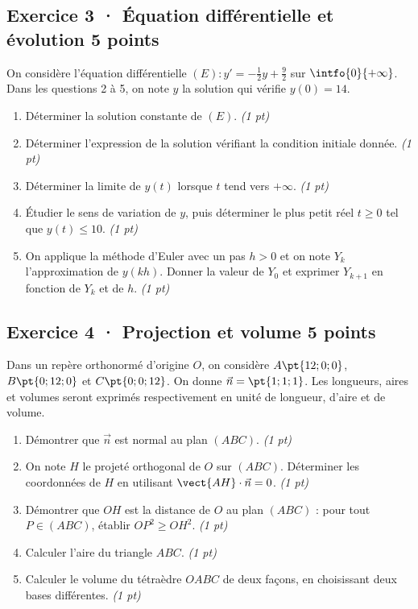 \mxnewpage{}

\subsection*{Exercice 3 · Équation différentielle et évolution \hfill 5 points}On considère l'équation différentielle $(E):y'=-\frac1{2}y+\frac{9}{2}$ sur $\intfo{0}{+\infty}$. Dans les questions 2 à 5, on note $y$ la solution qui vérifie $y(0)=14$.

\begin{enumerate}

\item Déterminer la solution constante de $(E)$. \hfill\textit{(1 pt)}

\item Déterminer l'expression de la solution vérifiant la condition initiale donnée. \hfill\textit{(1 pt)}

\item Déterminer la limite de $y(t)$ lorsque $t$ tend vers $+\infty$. \hfill\textit{(1 pt)}

\item Étudier le sens de variation de $y$, puis déterminer le plus petit réel $t\ge0$ tel que $y(t)\le10$. \hfill\textit{(1 pt)}

\item On applique la méthode d'Euler avec un pas $h>0$ et on note $Y_k$ l'approximation de $y(kh)$. Donner la valeur de $Y_0$ et exprimer $Y_{k+1}$ en fonction de $Y_k$ et de $h$. \hfill\textit{(1 pt)}

\end{enumerate}

\subsection*{Exercice 4 · Projection et volume \hfill 5 points}Dans un repère orthonormé d'origine $O$, on considère $A\pt{12;0;0}$, $B\pt{0;12;0}$ et $C\pt{0;0;12}$. On donne $\vec n=\pt{1;1;1}$. Les longueurs, aires et volumes seront exprimés respectivement en unité de longueur, d'aire et de volume.

\begin{enumerate}

\item Démontrer que $\vec n$ est normal au plan $(ABC)$. \hfill\textit{(1 pt)}

\item On note $H$ le projeté orthogonal de $O$ sur $(ABC)$. Déterminer les coordonnées de $H$ en utilisant $\vect{AH}\cdot\vec n=0$. \hfill\textit{(1 pt)}

\item Démontrer que $OH$ est la distance de $O$ au plan $(ABC)$ : pour tout $P\in(ABC)$, établir $OP^2\ge OH^2$. \hfill\textit{(1 pt)}

\item Calculer l'aire du triangle $ABC$. \hfill\textit{(1 pt)}

\item Calculer le volume du tétraèdre $OABC$ de deux façons, en choisissant deux bases différentes. \hfill\textit{(1 pt)}

\end{enumerate}

